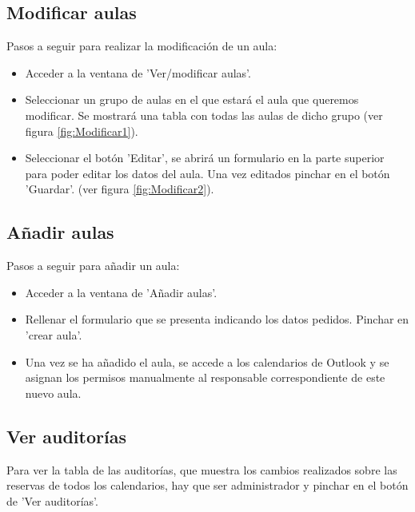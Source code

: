 \subsection{Modificar aulas}
Pasos a seguir para realizar la modificación de un aula:
\begin{itemize}
    \item Acceder a la ventana de 'Ver/modificar aulas'.
    \item Seleccionar un grupo de aulas en el que estará el aula que queremos modificar. Se mostrará una tabla con todas las aulas de dicho grupo (ver figura \ref{fig:Modificar1}).
    \item Seleccionar el botón 'Editar', se abrirá un formulario en la parte superior para poder editar los datos del aula. Una vez editados pinchar en el botón 'Guardar'. (ver figura \ref{fig:Modificar2}).
\end{itemize}

\subsection{Añadir aulas}
Pasos a seguir para añadir un aula:
\begin{itemize}
    \item Acceder a la ventana de 'Añadir aulas'.
    \item Rellenar el formulario que se presenta indicando los datos pedidos. Pinchar en 'crear aula'.
    \item Una vez se ha añadido el aula, se accede a los calendarios de Outlook y se asignan los permisos manualmente al responsable correspondiente de este nuevo aula.
\end{itemize}

\subsection{Ver auditorías}
Para ver la tabla de las auditorías, que muestra los cambios realizados sobre las reservas de todos los calendarios, hay que ser administrador y pinchar en el botón de 'Ver auditorías'.

